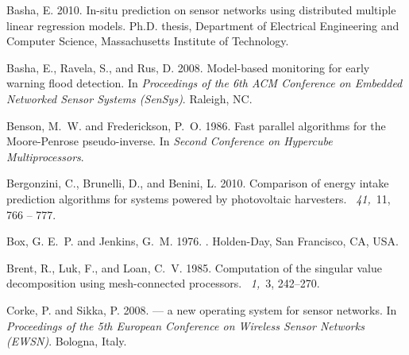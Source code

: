 \documentclass[prodmode,acmtosn]{acmsmall}
\begin{document}
\begin{thebibliography}{}

{\sc Basha, E.} 2010.
\newblock In-situ prediction on sensor networks using distributed multiple
  linear regression models.
\newblock Ph.D. thesis, Department of Electrical Engineering and Computer
  Science, Massachusetts Institute of Technology.

{\sc Basha, E.}, {\sc Ravela, S.}, {\sc and} {\sc Rus, D.} 2008.
\newblock Model-based monitoring for early warning flood detection.
\newblock In {\em Proceedings of the 6th ACM Conference on Embedded Networked
  Sensor Systems (SenSys)}. Raleigh, NC.

{\sc Benson, M.~W.} {\sc and} {\sc Frederickson, P.~O.} 1986.
\newblock Fast parallel algorithms for the {Moore-Penrose} pseudo-inverse.
\newblock In {\em Second Conference on Hypercube Multiprocessors}.

{\sc Bergonzini, C.}, {\sc Brunelli, D.}, {\sc and} {\sc Benini, L.} 2010.
\newblock Comparison of energy intake prediction algorithms for systems powered
  by photovoltaic harvesters.
~{\em 41,\/}~11, 766 -- 777.

{\sc Box, G. E.~P.} {\sc and} {\sc Jenkins, G.~M.} 1976.
.
\newblock Holden-Day, San Francisco, CA, USA.

{\sc Brent, R.}, {\sc Luk, F.}, {\sc and} {\sc Loan, C.~V.} 1985.
\newblock Computation of the singular value decomposition using mesh-connected
  processors.
~{\em 1,\/}~3,
  242--270.

{\sc Corke, P.} {\sc and} {\sc Sikka, P.} 2008.
 --- a new operating system for sensor networks.
\newblock In {\em Proceedings of the 5th European Conference on Wireless Sensor
  Networks (EWSN)}. Bologna, Italy.


\end{thebibliography}
\end{document}
